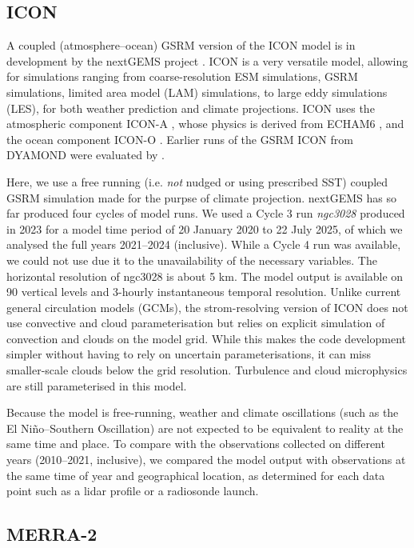 \documentclass[12pt,a4paper]{article}
\begin{document}
\subsection{ICON}

A coupled (atmosphere--ocean) GSRM version of the ICON model is in development
by the nextGEMS project \citep{hohenegger2023}. ICON is a very versatile model,
allowing for simulations ranging from coarse-resolution ESM simulations, GSRM
simulations, limited area model (LAM) simulations, to large eddy simulations
(LES), for both weather prediction and climate projections. ICON uses the
atmospheric component ICON-A \citep{giorgetta2018}, whose physics is derived
from ECHAM6 \citep{stevens2013}, and the ocean component ICON-O
\citep{korn2022}. Earlier runs of the GSRM ICON from DYAMOND were evaluated by
\cite{mauritsen2022}.

Here, we use a free running (i.e. \emph{not} nudged or using prescribed SST)
coupled GSRM simulation made for the purpse of climate projection.  nextGEMS
has so far produced four cycles of model runs. We used a Cycle 3 run
\emph{ngc3028} produced in 2023 \citep{nextgems2023a,nextgems2023b} for a model
time period of 20 January 2020 to 22 July 2025, of which we analysed the full
years 2021--2024 (inclusive). While a Cycle 4 run was available, we could not
use due it to the unavailability of the necessary variables. The horizontal
resolution of ngc3028 is about 5 km.  The model output is available on 90
vertical levels and 3-hourly instantaneous temporal resolution.  Unlike current
general circulation models (GCMs), the strom-resolving version of ICON does not
use convective and cloud parameterisation but relies on explicit simulation of
convection and clouds on the model grid. While this makes the code development
simpler without having to rely on uncertain parameterisations, it can miss
smaller-scale clouds below the grid resolution.  Turbulence and cloud
microphysics are still parameterised in this model.

Because the model is free-running, weather and climate oscillations (such as
the El Niño--Southern Oscillation) are not expected to be equivalent to reality
at the same time and place. To compare with the observations collected on
different years (2010--2021, inclusive), we compared the model output with
observations at the same time of year and geographical location, as determined
for each data point such as a lidar profile or a radiosonde launch.

\subsection{MERRA-2}
\end{document}
